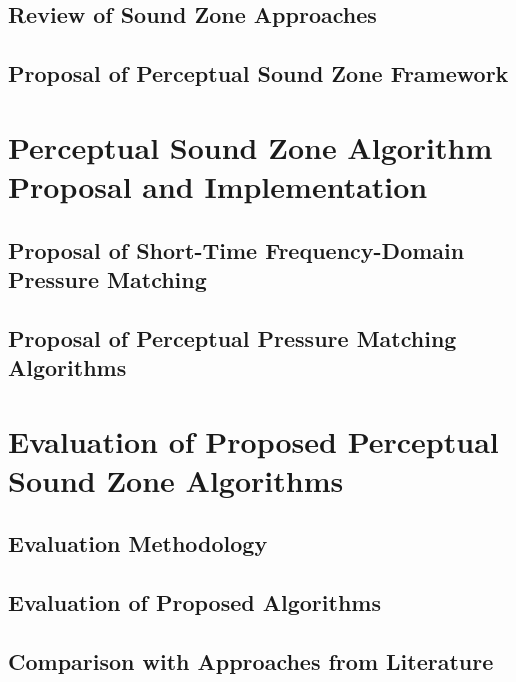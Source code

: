 \documentclass[10pt,twoside,openright,titlepage]{ce}
\begin{document}
\section{Review of Sound Zone Approaches}
\label{ch:sound_zone:approaches}

\newpage
\section{Proposal of Perceptual Sound Zone Framework}
\label{ch:sound_zone:approach_selection}

\newpage

\chapter{Perceptual Sound Zone Algorithm Proposal and Implementation}
\label{ch:perceptual_sound_zone}

\newpage
\section{Proposal of Short-Time Frequency-Domain Pressure Matching}
\label{ch:perceptual_sound_zone:stft}

\newpage
\section{Proposal of Perceptual Pressure Matching Algorithms}
\label{ch:perceptual_sound_zone:perceptual_minimization}

\newpage

\chapter{Evaluation of Proposed Perceptual Sound Zone Algorithms}
\label{ch:results}

\newpage
\section{Evaluation Methodology}
\label{ch:results:methodology}

\newpage
\section{Evaluation of Proposed Algorithms}
\label{ch:results:evaluation}

\newpage
\section{Comparison with Approaches from Literature}
\label{ch:results:comparision}

\end{document}
